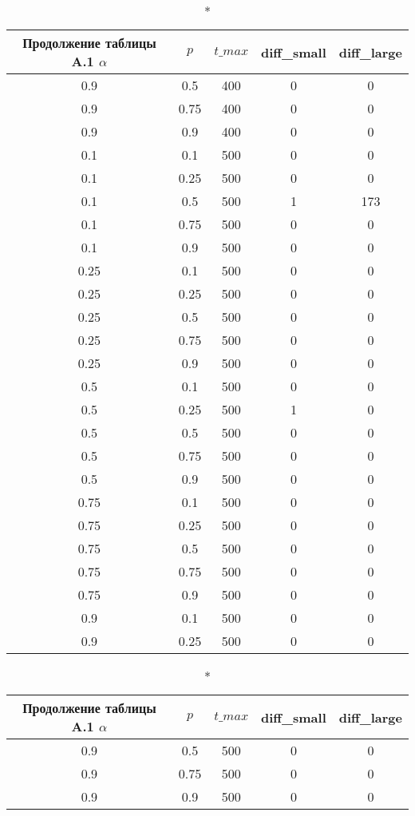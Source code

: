 \begin{longtable}[c]{|c|c|c|c|c|}
\caption*{Продолжение таблицы A.1}
\hline
$\alpha$ & $p$ & $t\_max$ & diff\_small & diff\_large
\tabularnewline 
\hline
0.9 & 0.5 & 400 & 0 & 0 \\ 
\hline
0.9 & 0.75 & 400 & 0 & 0 \\ 
\hline
0.9 & 0.9 & 400 & 0 & 0 \\ 
\hline
0.1 & 0.1 & 500 & 0 & 0 \\ 
\hline
0.1 & 0.25 & 500 & 0 & 0 \\ 
\hline
0.1 & 0.5 & 500 & 1 & 173 \\ 
\hline
0.1 & 0.75 & 500 & 0 & 0 \\ 
\hline
0.1 & 0.9 & 500 & 0 & 0 \\ 
\hline
0.25 & 0.1 & 500 & 0 & 0 \\ 
\hline
0.25 & 0.25 & 500 & 0 & 0 \\ 
\hline
0.25 & 0.5 & 500 & 0 & 0 \\ 
\hline
0.25 & 0.75 & 500 & 0 & 0 \\ 
\hline
0.25 & 0.9 & 500 & 0 & 0 \\ 
\hline
0.5 & 0.1 & 500 & 0 & 0 \\ 
\hline
0.5 & 0.25 & 500 & 1 & 0 \\ 
\hline
0.5 & 0.5 & 500 & 0 & 0 \\ 
\hline
0.5 & 0.75 & 500 & 0 & 0 \\ 
\hline
0.5 & 0.9 & 500 & 0 & 0 \\ 
\hline
0.75 & 0.1 & 500 & 0 & 0 \\ 
\hline
0.75 & 0.25 & 500 & 0 & 0 \\ 
\hline
0.75 & 0.5 & 500 & 0 & 0 \\ 
\hline
0.75 & 0.75 & 500 & 0 & 0 \\ 
\hline
0.75 & 0.9 & 500 & 0 & 0 \\ 
\hline
0.9 & 0.1 & 500 & 0 & 0 \\ 
\hline
0.9 & 0.25 & 500 & 0 & 0 \\ 
\hline
\end{longtable}

\begin{longtable}[c]{|c|c|c|c|c|}
\caption*{Продолжение таблицы A.1}
\hline
$\alpha$ & $p$ & $t\_max$ & diff\_small & diff\_large
\tabularnewline 
\hline
0.9 & 0.5 & 500 & 0 & 0 \\ 
\hline
0.9 & 0.75 & 500 & 0 & 0 \\ 
\hline
0.9 & 0.9 & 500 & 0 & 0 \\ 
\hline
\end{longtable}